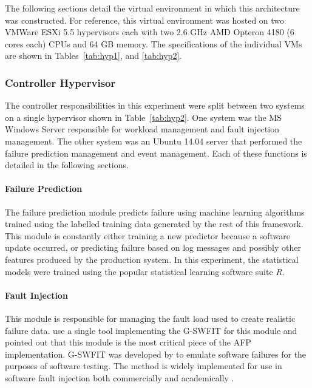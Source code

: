 
The following sections detail the virtual environment in which this
architecture was constructed.  For reference, this virtual environment was
hosted on two VMWare ESXi 5.5 hypervisors each with two 2.6 \ac{GHz} AMD
Opteron 4180 (6 cores each) \ac{CPU}s and 64 \ac{GB} memory.  The
specifications of the individual \ac{VM}s are shown in Tables~\ref{tab:hyp1},
and \ref{tab:hyp2}.

\tabHypervisorOne
\tabHypervisorTwo

\setcounter{secnumdepth}{5}

\subsubsection{Controller Hypervisor} \label{sec:controller} %
The controller responsibilities in this experiment were split between two
systems on a single hypervisor shown in Table~\ref{tab:hyp2}.  One system was
the \ac{MS} Windows Server responsible for workload management and fault
injection management.  The other system was an Ubuntu 14.04 server that
performed the failure prediction management and event management.  Each of
these functions is detailed in the following sections.

\paragraph{Failure Prediction} \label{sec:failurePrediction} %
The failure prediction module predicts failure using machine learning
algorithms trained using the labelled training data generated by the rest of
this framework.  This module is constantly either training a new predictor
because a software update occurred, or predicting failure based on log messages
and possibly other features produced by the production system.  In this
experiment, the statistical models were trained using the popular statistical
learning software suite \emph{R}.

\paragraph{Fault Injection} \label{sec:faultInjectionMgr}
This module is responsible for managing the fault load used to create realistic
failure data.  \citet{irrera2015} use a single tool implementing the
\ac{G-SWFIT} for this module and pointed out that this module is the most
critical piece of the \ac{AFP} implementation.  \ac{G-SWFIT} was developed by
\citet{gswfit} to emulate software failures for the purposes of software
testing.  The method is widely implemented for use in software fault injection
both commercially and academically
\citep{cotroneo2012,irrera2014,natella2010,umadevi2015}. 


